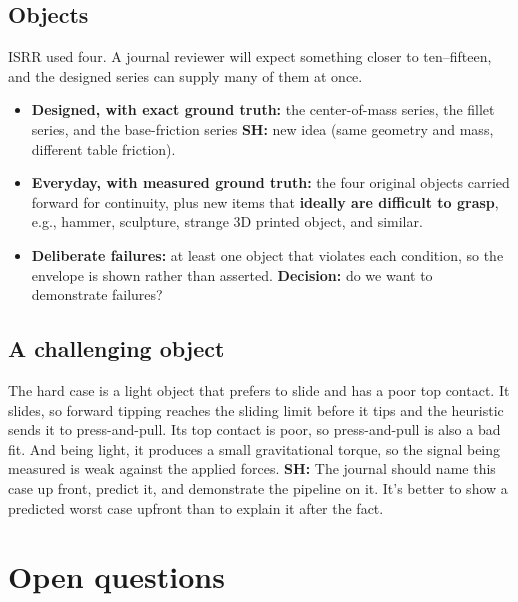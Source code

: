 \documentclass[10pt, conference]{IEEEtran}
\newcommand{\sh}[1]{\textcolor{orange!90!black}{\textbf{SH:} #1}}
\newcommand{\decision}[1]{\textcolor{red!80!black}{\textbf{Decision:} #1}}
\begin{document}
\subsection{Objects}
ISRR used four. A journal reviewer will expect something closer to ten--fifteen, and the designed series can supply many of them at once.

\begin{itemize}[leftmargin=*, itemsep=1pt]
  \item \textbf{Designed, with exact ground truth:} the center-of-mass series, the fillet series, and the base-friction series \sh{new idea} (same geometry and mass, different table friction).
  \item \textbf{Everyday, with measured ground truth:} the four original objects carried forward for continuity, plus new items that \textbf{ideally are difficult to grasp}, e.g., hammer, sculpture, strange 3D printed object, and similar.
  \item \textbf{Deliberate failures:} at least one object that violates each condition, so the envelope is shown rather than asserted. \decision{do we want to demonstrate failures?}
\end{itemize}


\subsection{A challenging object}
The hard case is a light object that prefers to slide and has a poor top contact. It slides, so forward tipping reaches the sliding limit before it tips and the heuristic sends it to press-and-pull. Its top contact is poor, so press-and-pull is also a bad fit. And being light, it produces a small gravitational torque, so the signal being measured is weak against the applied forces. \sh{The journal should name this case up front}, predict it, and demonstrate the pipeline on it. It's better to show a predicted worst case upfront than to explain it after the fact.

\section{Open questions}

\end{document}

